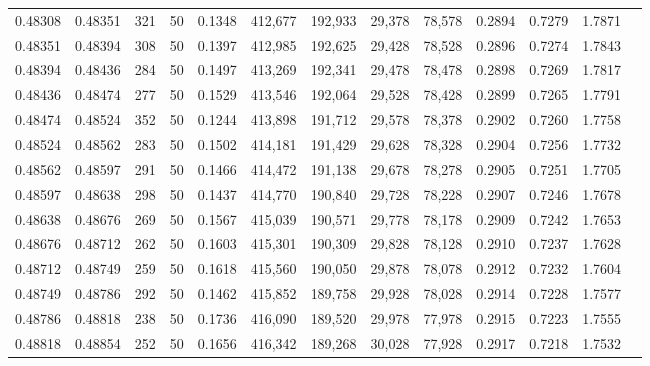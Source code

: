 \begin{tabular}{rrrrrrrrrrrrr}
0.48308 & 0.48351 &   321 &  50 &                                     0.1348 & 412,677 & 192,933 &  29,378 &  78,578 & 0.2894 & 0.7279 & 1.7871 \\
0.48351 & 0.48394 &   308 &  50 &                                     0.1397 & 412,985 & 192,625 &  29,428 &  78,528 & 0.2896 & 0.7274 & 1.7843 \\
0.48394 & 0.48436 &   284 &  50 &                                     0.1497 & 413,269 & 192,341 &  29,478 &  78,478 & 0.2898 & 0.7269 & 1.7817 \\
0.48436 & 0.48474 &   277 &  50 &                                     0.1529 & 413,546 & 192,064 &  29,528 &  78,428 & 0.2899 & 0.7265 & 1.7791 \\
0.48474 & 0.48524 &   352 &  50 &                                     0.1244 & 413,898 & 191,712 &  29,578 &  78,378 & 0.2902 & 0.7260 & 1.7758 \\
0.48524 & 0.48562 &   283 &  50 &                                     0.1502 & 414,181 & 191,429 &  29,628 &  78,328 & 0.2904 & 0.7256 & 1.7732 \\
0.48562 & 0.48597 &   291 &  50 &                                     0.1466 & 414,472 & 191,138 &  29,678 &  78,278 & 0.2905 & 0.7251 & 1.7705 \\
0.48597 & 0.48638 &   298 &  50 &                                     0.1437 & 414,770 & 190,840 &  29,728 &  78,228 & 0.2907 & 0.7246 & 1.7678 \\
0.48638 & 0.48676 &   269 &  50 &                                     0.1567 & 415,039 & 190,571 &  29,778 &  78,178 & 0.2909 & 0.7242 & 1.7653 \\
0.48676 & 0.48712 &   262 &  50 &                                     0.1603 & 415,301 & 190,309 &  29,828 &  78,128 & 0.2910 & 0.7237 & 1.7628 \\
0.48712 & 0.48749 &   259 &  50 &                                     0.1618 & 415,560 & 190,050 &  29,878 &  78,078 & 0.2912 & 0.7232 & 1.7604 \\
0.48749 & 0.48786 &   292 &  50 &                                     0.1462 & 415,852 & 189,758 &  29,928 &  78,028 & 0.2914 & 0.7228 & 1.7577 \\
0.48786 & 0.48818 &   238 &  50 &                                     0.1736 & 416,090 & 189,520 &  29,978 &  77,978 & 0.2915 & 0.7223 & 1.7555 \\
0.48818 & 0.48854 &   252 &  50 &                                     0.1656 & 416,342 & 189,268 &  30,028 &  77,928 & 0.2917 & 0.7218 & 1.7532 \\

\end{tabular}

